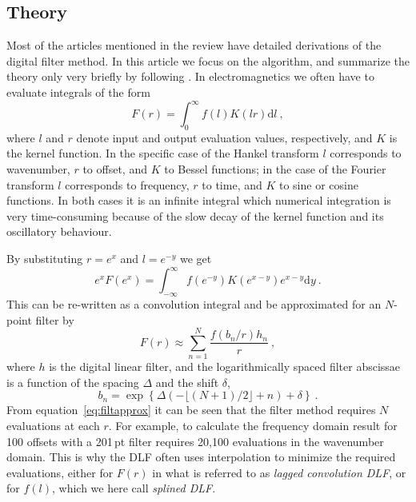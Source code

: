 \documentclass[paper,twocolumn,twoside]{geophysics}
\newcommand{\mr}[1]{\mathrm{#1}}
\begin{document}
\subsection{Theory}

Most of the articles mentioned in the review have detailed derivations of the
digital filter method. In this article we focus on the algorithm, and summarize
the theory only very briefly by following \cite{GEO.12.Key}. In
electromagnetics we often have to evaluate integrals of the form
%
\begin{equation}
  F(r) = \int^\infty_0 f(l)K(l r)\mr{d}l \ ,
  \label{eq:HankelInt}
\end{equation}
%
where $l$ and $r$ denote input and output evaluation values, respectively, and
$K$ is the kernel function. In the specific case of the Hankel transform $l$
corresponds to wavenumber, $r$ to offset, and $K$ to Bessel functions; in the
case of the Fourier transform $l$ corresponds to frequency, $r$ to time, and
$K$ to sine or cosine functions. In both cases it is an infinite integral which
numerical integration is very time-consuming because of the slow decay of the
kernel function and its oscillatory behaviour.

By substituting $r = e^x$ and $l = e^{-y}$ we get
%
\begin{equation}
  e^x F(e^x) = \int^\infty_{-\infty} f(e^{-y})K(e^{x-y})e^{x-y}\mr{d}y\ .
  \label{eq:filtint}
\end{equation}
%
This can be re-written as a convolution integral and be approximated for an
$N$-point filter by
%
\begin{equation}
  F(r) \approx \sum^N_{n=1} \frac{f(b_n/r) h_n}{r}\ ,
  \label{eq:filtapprox}
\end{equation}
%
where $h$ is the digital linear filter, and the logarithmically spaced filter
abscissae is a function of the spacing $\Delta$ and the shift $\delta$,
%
\begin{equation}
  b_n = \exp\left\{\Delta(-\lfloor{(N+1)/2\rfloor}+n) + \delta\right\} \ .
  \label{eq:base}
\end{equation}
%
From equation~\ref{eq:filtapprox} it can be seen that the filter method
requires $N$ evaluations at each $r$. For example, to calculate the frequency
domain result for 100 offsets with a 201\,pt filter requires 20,100 evaluations
in the wavenumber domain. This is why the DLF often uses interpolation to
minimize the required evaluations, either for $F(r)$ in what is referred to as
\emph{lagged convolution DLF}, or for $f(l)$, which we here call \emph{splined
DLF}.
\end{document}
